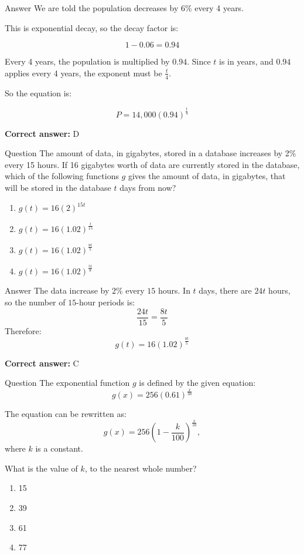 \documentclass{beamer}
\begin{document}
\begin{frame}{Answer}
We are told the population decreases by 6\% every 4 years.

This is exponential decay, so the decay factor is:

\[
1 - 0.06 = 0.94
\]

Every 4 years, the population is multiplied by $0.94$. Since $t$ is in years, and $0.94$ applies every 4 years, the exponent must be $\frac{t}{4}$.

So the equation is:

\[
P = 14{,}000(0.94)^{\frac{t}{4}}
\]

\textbf{Correct answer:} D
\end{frame}


\begin{frame}{Question}
The amount of data, in gigabytes, stored in a database increases by 2\% every 15 hours. If 16 gigabytes worth of data are currently stored in the database, which of the following functions $g$ gives the amount of data, in gigabytes, that will be stored in the database $t$ days from now?

\begin{enumerate}
  \item[A)] $g(t) = 16(2)^{15t}$
  \item[B)] $g(t) = 16(1.02)^{\frac{t}{15}}$
  \item[C)] $g(t) = 16(1.02)^{\frac{8t}{5}}$
  \item[D)] $g(t) = 16(1.02)^{\frac{5t}{8}}$
\end{enumerate}
\end{frame}


\begin{frame}{Answer}
The data increase by $2\%$ every $15$ hours. In $t$ days, there are $24t$ hours, so the number of $15$-hour periods is:
\[
\frac{24t}{15} = \frac{8t}{5}
\]
Therefore:
\[
g(t) = 16(1.02)^{\frac{8t}{5}}
\]

\textbf{Correct answer:} C
\end{frame}

\begin{frame}{Question}
The exponential function $g$ is defined by the given equation:
\[
g(x) = 256(0.61)^{\frac{x}{30}}
\]

The equation can be rewritten as:
\[
g(x) = 256\left(1 - \frac{k}{100}\right)^{\frac{x}{10}},
\]
where $k$ is a constant.

What is the value of $k$, to the nearest whole number?

\begin{enumerate}
  \item[A)] 15
  \item[B)] 39
  \item[C)] 61
  \item[D)] 77
\end{enumerate}
\end{frame}
\end{document}
